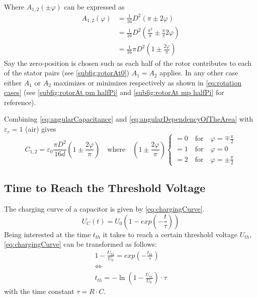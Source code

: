        Where \( A_{1,2}(\pm \varphi) \) can be expressed as
        \begin{align}
            A_{1,2}(\varphi)  &= \frac{1}{16}D^2 \left( \pi \pm 2\varphi \right) \nonumber \\
                        &= \frac{1}{16}D^2 \left( \frac{\pi^2}{\pi} \pm \frac{\pi}{\pi}2\varphi \right) \nonumber \\
                        &= \frac{1}{16} \pi D^2 \left( 1 \pm \frac{2\varphi}{\pi}\right)
            \label{eq:angularDependencyOfTheArea}
        \end{align}
        Say the zero-position is chosen such as each half of the rotor contributes to each of the stator pairs (see \cref{subfig:rotorAt0})
        \(A_1 = A_2\) applies. In any other case either \(A_1\) or \(A_2\) maximizes or minimizes respectively as shown in
        \cref{eq:rotation cases} (see \cref{subfig:rotorAt pm halfPi} and \cref{subfig:rotorAt mp halfPi} for reference).\par\medskip
        Combining \cref{eq:angularCapacitance} and \cref{eq:angularDependencyOfTheArea} with \(\varepsilon_r = 1\) (air) gives
        \begin{equation}
            C_{1,2} = \varepsilon_0 \frac{\pi D^2}{16d} \left( 1 \pm \frac{2\varphi}{\pi} \right) \quad \text{where} \quad \left(1 \pm \frac{2\varphi}{\pi} \right)
            \begin{cases}
                = 0 \quad \text{for} \quad \varphi = \mp \frac{\pi}{2} \nonumber \\
                = 1 \quad \text{for} \quad \varphi = 0 \nonumber \\
                = 2 \quad \text{for} \quad \varphi = \pm \frac{\pi}{2} \nonumber
            \end{cases}
            \label{eq:rotation cases}
        \end{equation}
    \subsection{Time to Reach the Threshold Voltage}\label{sec:preparation_task_6}
        The charging curve of a capacitor is given by \cref{eq:chargingCurve}.
        \begin{equation}
            U_C(t) = U_0 \left(1-exp\left(-\frac{t}{\tau}\right)\right)
            \label{eq:chargingCurve}
        \end{equation}
        Being interested at the time \( t_{th} \) it takes to reach a certain threshold voltage \( U_{th} \), \cref{eq:chargingCurve}
        can be transformed as follows:
        \begin{gather}
            1- \frac{U_{th}}{U_0} = exp\left(-\frac{t_{th}}{\tau}\right) \nonumber \\
            \Leftrightarrow \nonumber \\
            t_{th} = - \ln\left(1- \frac{U_{th}}{U_0}\right) \cdot \tau
            \label{eq:timeToThresholfVoltage}
        \end{gather}
        with the time constant \( \tau = R \cdot C \).
